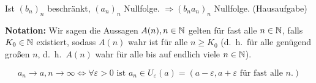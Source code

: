 \documentclass[../ana1.tex]{subfiles}
\begin{document}
\begin{bsp}
	Ist \( {(b_n)}_n \) beschränkt, \( {(a_n)}_n \) Nullfolge. \( \Rightarrow {(b_n a_n)}_n \) Nullfolge. (Hausaufgabe)
\end{bsp}

\textbf{Notation:} Wir sagen die Aussagen \( A(n), n\in\mathbb{N} \) gelten für fast alle \( n\in\mathbb{N} \), falls \( K_0\in\mathbb{N} \) existiert, sodass \(A(n) \) wahr ist für alle \( n\geq K_0 \) (d.\ h.\ für alle genügend großen \( n \), d.\ h.\  \( A(n) \) wahr für alle bis auf endlich viele \(n\in\mathbb{N} \)).

\begin{bsp}
	\[ a_n\rightarrow a,n\rightarrow\infty \Leftrightarrow \forall \varepsilon > 0 \text{ ist } a_n\in U_\varepsilon(a) = (a-\varepsilon, a+\varepsilon \text{ für fast alle } n.) \]
\end{bsp}
\end{document}
